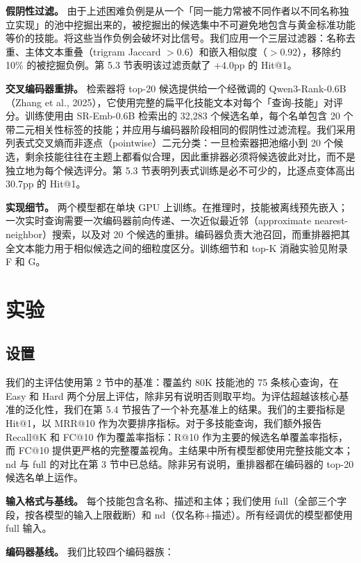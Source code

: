 \documentclass[11pt,UTF8,fontset=fandol]{ctexart}
\makeatletter
\newcommand{\Hit}{Hit@1}
\makeatother
\begin{document}
\textbf{假阴性过滤。} 由于上述困难负例是从一个「同一能力常被不同作者以不同名称独立实现」的池中挖掘出来的，被挖掘出的候选集中不可避免地包含与黄金标准功能等价的技能。将这些当作负例会破坏对比信号。我们应用一个三层过滤器：名称去重、主体文本重叠（trigram Jaccard $> 0.6$）和嵌入相似度（$> 0.92$），移除约 10\% 的被挖掘负例。第 5.3 节表明该过滤贡献了 $+4.0$pp 的 \Hit{}。

\textbf{交叉编码器重排。} 检索器将 top-20 候选提供给一个经微调的 Qwen3-Rank-0.6B（Zhang et al., 2025），它使用完整的扁平化技能文本对每个「查询-技能」对评分。训练使用由 SR-Emb-0.6B 检索出的 32,283 个候选名单，每个名单包含 20 个带二元相关性标签的技能；并应用与编码器阶段相同的假阴性过滤流程。我们采用列表式交叉熵而非逐点（pointwise）二元分类：一旦检索器把池缩小到 20 个候选，剩余技能往往在主题上都看似合理，因此重排器必须将候选彼此对比，而不是独立地为每个候选评分。第 5.3 节表明列表式训练是必不可少的，比逐点变体高出 30.7pp 的 \Hit{}。

\textbf{实现细节。} 两个模型都在单块 GPU 上训练。在推理时，技能被离线预先嵌入；一次实时查询需要一次编码器前向传递、一次近似最近邻（approximate nearest-neighbor）搜索，以及对 20 个候选的重排。编码器负责大池召回，而重排器把其全文本能力用于相似候选之间的细粒度区分。训练细节和 top-K 消融实验见附录 F 和 G。

\section{实验}

\subsection{设置}

我们的主评估使用第 2 节中的基准：覆盖约 80K 技能池的 75 条核心查询，在 Easy 和 Hard 两个分层上评估，除非另有说明否则取平均。为评估超越该核心基准的泛化性，我们在第 5.4 节报告了一个补充基准上的结果。我们的主要指标是 \Hit{}，以 MRR@10 作为次要排序指标。对于多技能查询，我们额外报告 Recall@K 和 FC@10 作为覆盖率指标：R@10 作为主要的候选名单覆盖率指标，而 FC@10 提供更严格的完整覆盖视角。主结果中所有模型都使用完整技能文本；nd 与 full 的对比在第 3 节中已总结。除非另有说明，重排器都在编码器的 top-20 候选名单上运作。

\textbf{输入格式与基线。} 每个技能包含名称、描述和主体；我们使用 full（全部三个字段，按各模型的输入上限截断）和 nd（仅名称+描述）。所有经调优的模型都使用 full 输入。

\textbf{编码器基线。} 我们比较四个编码器族：
\end{document}

